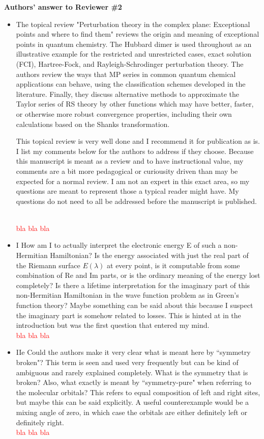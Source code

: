 \documentclass[10pt]{letter}
\newcommand{\alert}[1]{\textcolor{red}{#1}}
\begin{document}
\begin{letter}
\noindent \textbf{\large Authors' answer to Reviewer \#2}

\begin{itemize}

	\item 
	{The topical review "Perturbation theory in the complex plane: Exceptional points and where to find them" reviews the origin and meaning of exceptional points in quantum chemistry. The Hubbard dimer is used throughout as an illustrative example for the restricted and unrestricted cases, exact solution (FCI), Hartree-Fock, and Rayleigh-Schrodinger perturbation theory. The authors review the ways that MP series in common quantum chemical applications can behave, using the classification schemes developed in the literature. Finally, they discuss alternative methods to approximate the Taylor series of RS theory by other functions which may have better, faster, or otherwise more robust convergence properties, including their own calculations based on the Shanks transformation.

This topical review is very well done and I recommend it for publication as is. I list my comments below for the authors to address if they choose. Because this manuscript is meant as a review and to have instructional value, my comments are a bit more pedagogical or curiousity driven than may be expected for a normal review. I am not an expert in this exact area, so my questions are meant to represent those a typical reader might have. My questions do not need to all be addressed before the manuscript is published.}
	\\
	\alert{bla bla bla}


\item 
{I
How am I to actually interpret the electronic energy E of such a non-Hermitian Hamiltonian? Is the energy associated with just the real part of the Riemann surface $E(\lambda)$ at every point, is it computable from some combination of Re and Im parts, or is the ordinary meaning of the energy lost completely? Is there a lifetime interpretation for the imaginary part of this non-Hermitian Hamiltonian in the wave function problem as in Green's function theory? Maybe something can be said about this because I suspect the imaginary part is somehow related to losses. This is hinted at in the introduction but was the first question that entered my mind.}
	\\
	\alert{bla bla bla}

\item 
{IIe
Could the authors make it very clear what is meant here by ``symmetry broken"? This term is seen and used very frequently but can be kind of ambiguous and rarely explained completely. What is the symmetry that is broken? Also, what exactly is meant by ``symmetry-pure" when referring to the molecular orbitals? This refers to equal composition of left and right sites, but maybe this can be said explicitly. A useful counterexample would be a mixing angle of zero, in which case the orbitals are either definitely left or definitely right.}
	\\
	\alert{bla bla bla}


\end{itemize}
\end{letter}
\end{document}
